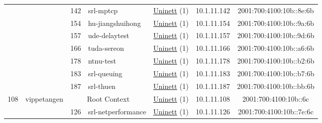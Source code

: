 \begin{small}
\begin{center}
\begin{longtable}{|c|c|c|c|c|c|c|c|}
  &  & \tiny{142} & \multicolumn{1}{|l|}{\tiny{srl-mptcp}} & \multicolumn{2}{|c|}{\tiny{\href{https://www.uninett.no}{Uninett} (1)}} & \tiny{10.1.11.142} & \tiny{2001:700:4100:10b::8e:6b} \\* \cline{3-3}\cline{4-4}\cline{5-5}\cline{6-6}\cline{7-7}\cline{8-8}
  &  & \tiny{154} & \multicolumn{1}{|l|}{\tiny{hu-jiangshuihong}} & \multicolumn{2}{|c|}{\tiny{\href{https://www.uninett.no}{Uninett} (1)}} & \tiny{10.1.11.154} & \tiny{2001:700:4100:10b::9a:6b} \\* \cline{3-3}\cline{4-4}\cline{5-5}\cline{6-6}\cline{7-7}\cline{8-8}
  &  & \tiny{157} & \multicolumn{1}{|l|}{\tiny{ude-delaytest}} & \multicolumn{2}{|c|}{\tiny{\href{https://www.uninett.no}{Uninett} (1)}} & \tiny{10.1.11.157} & \tiny{2001:700:4100:10b::9d:6b} \\* \cline{3-3}\cline{4-4}\cline{5-5}\cline{6-6}\cline{7-7}\cline{8-8}
  &  & \tiny{166} & \multicolumn{1}{|l|}{\tiny{tuda-sereon}} & \multicolumn{2}{|c|}{\tiny{\href{https://www.uninett.no}{Uninett} (1)}} & \tiny{10.1.11.166} & \tiny{2001:700:4100:10b::a6:6b} \\* \cline{3-3}\cline{4-4}\cline{5-5}\cline{6-6}\cline{7-7}\cline{8-8}
  &  & \tiny{178} & \multicolumn{1}{|l|}{\tiny{ntnu-test}} & \multicolumn{2}{|c|}{\tiny{\href{https://www.uninett.no}{Uninett} (1)}} & \tiny{10.1.11.178} & \tiny{2001:700:4100:10b::b2:6b} \\* \cline{3-3}\cline{4-4}\cline{5-5}\cline{6-6}\cline{7-7}\cline{8-8}
  &  & \tiny{183} & \multicolumn{1}{|l|}{\tiny{srl-queuing}} & \multicolumn{2}{|c|}{\tiny{\href{https://www.uninett.no}{Uninett} (1)}} & \tiny{10.1.11.183} & \tiny{2001:700:4100:10b::b7:6b} \\* \cline{3-3}\cline{4-4}\cline{5-5}\cline{6-6}\cline{7-7}\cline{8-8}
  &  & \tiny{187} & \multicolumn{1}{|l|}{\tiny{srl-thuen}} & \multicolumn{2}{|c|}{\tiny{\href{https://www.uninett.no}{Uninett} (1)}} & \tiny{10.1.11.187} & \tiny{2001:700:4100:10b::bb:6b} \\ \hline
 \multirow{8}{*}{\tiny{108}} & \multicolumn{1}{|l|}{\multirow{8}{*}{\tiny{vippetangen}}} & \multicolumn{2}{|c|}{\tiny{Root Context}} & \multicolumn{2}{|c|}{\tiny{\href{https://www.uninett.no}{Uninett} (1)}} & \tiny{10.1.11.108} & \tiny{2001:700:4100:10b::6c} \\* \cline{3-3}\cline{4-4}\cline{5-5}\cline{6-6}\cline{7-7}\cline{8-8}
  &  & \tiny{126} & \multicolumn{1}{|l|}{\tiny{srl-netperformance}} & \multicolumn{2}{|c|}{\tiny{\href{https://www.uninett.no}{Uninett} (1)}} & \tiny{10.1.11.126} & \tiny{2001:700:4100:10b::7e:6c} \\* \cline{3-3}\cline{4-4}\cline{5-5}\cline{6-6}\cline{7-7}\cline{8-8}

\end{longtable}
\end{center}
\end{small}
